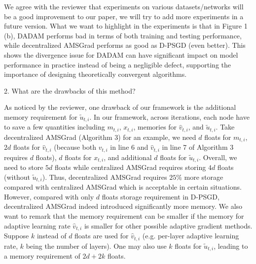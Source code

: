 \documentclass{article} %
\begin{document}
We agree with the reviewer that experiments on various datasets/networks will be a good improvement to our paper, we will try to add more experiments in a future version. What we want to highlight in the experiments is that in Figure 1 (b), DADAM performs bad in terms of both training and testing performance, while decentralized AMSGrad performs as good as D-PSGD (even better). This shows the divergence issue for DADAM can have significant impact on model performance in practice instead of being a negligible defect, supporting the importance of designing theoretically convergent algorithms. %

2. What are the drawbacks of this method?

As noticed by the reviewer, one drawback of our framework is the additional memory requirement for $\tilde{u}_{t,i}$. In our framework, across iterations, each node have to save a few quantities including $m_{t,i}$, $x_{t,i}$, memories for $\hat v_{t,i}$, and $\tilde{u}_{t,i}$. Take decentralized AMSGrad (Algorithm 3) for an example, we  need $d$ floats for  $m_{t,i}$, $2d$ floats for $\hat v_{t,i}$ (because both $v_{t,i}$ in line 6 and $\hat v_{t,i}$ in line 7 of Algorithm 3 requires $d$ floats), $d$ floats for $x_{t,i}$, and additional $d$ floats for $\tilde u_{t,i}$. Overall, we need to store $5d$ floats while centralized AMSGrad requires storing $4d$ floats (without $\tilde u_{t,i}$).  Thus, decentralized AMSGrad requires $25\%$ more storage compared with centralized AMSGrad which is acceptable in certain situations. However, compared with only $d$ floats storage requirement in D-PSGD, decentralized AMSGrad indeed introduced significantly more memory.  We also want to remark that the memory requirement can be smaller if the memory for adaptive learning rate $\hat v_{t,i}$ is smaller for other possible adaptive gradient methods. Suppose $k$ instead of $d$ floats are used for $\hat v_{t,i}$ (e.g. per-layer adaptive learning rate, $k$ being the number of layers). One may also use $k$ floats for $\tilde u_{t,i}$, leading to a memory requirement of $2d+2k$ floats. 
\end{document}
